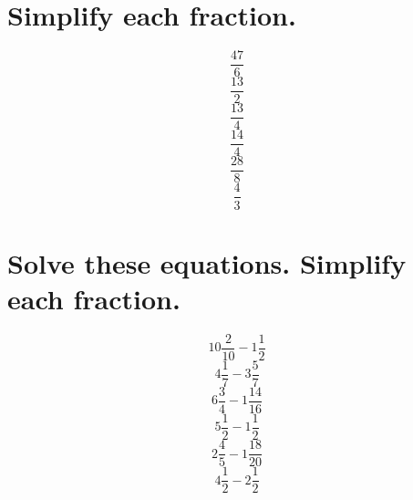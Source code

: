 \documentclass[12pt, fleqn, leqno]{article}
\begin{document}
    \section*{Simplify each fraction.}
\thispagestyle{plain}
        \begin{equation}\frac{47}{6}\end{equation}
        \vspace{4cm}
        \begin{equation}\frac{13}{2}\end{equation}
        \vspace{4cm}
        \begin{equation}\frac{13}{4}\end{equation}
        \vspace{4cm}
        \begin{equation}\frac{14}{4}\end{equation}
        \vspace{4cm}
        \begin{equation}\frac{28}{8}\end{equation}
        \vspace{4cm}
        \begin{equation}\frac{4}{3}\end{equation}
        \vspace{4cm}
\newpage
\section*{Solve these equations. Simplify each fraction.}
\thispagestyle{plain}
        \begin{equation}10\frac{2}{10} - 1\frac{1}{2}\end{equation}
        \vspace{4cm}
        \begin{equation}4\frac{1}{7} - 3\frac{5}{7}\end{equation}
        \vspace{4cm}
        \begin{equation}6\frac{3}{4} - 1\frac{14}{16}\end{equation}
        \vspace{4cm}
        \begin{equation}5\frac{1}{2} - 1\frac{1}{2}\end{equation}
        \vspace{4cm}
        \begin{equation}2\frac{4}{5} - 1\frac{18}{20}\end{equation}
        \vspace{4cm}
        \begin{equation}4\frac{1}{2} - 2\frac{1}{2}\end{equation}
        \vspace{4cm}
\newpage
\end{document}
